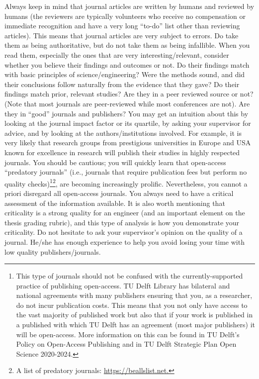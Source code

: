 \documentclass{article}
\begin{document}
Always keep in mind that journal articles are written by humans and reviewed by humans (the reviewers are typically volunteers who receive no compensation or immediate recognition and have a very long “to-do” list other than reviewing articles). This means that journal articles are very subject to errors. Do take them as being authoritative, but do not take them as being infallible. When you read them, especially the ones that are very interesting/relevant, consider whether you believe their findings and outcomes or not. Do their findings match with basic principles of science/engineering? Were the methods sound, and did their conclusions follow naturally from the evidence that they gave? Do their findings match prior, relevant studies? Are they in a peer reviewed source or not? (Note that most journals are peer-reviewed while most conferences are not). Are they in “good” journals and publishers? You may get an intuition about this by looking at the journal impact factor or its quartile, by asking your supervisor for advice, and by looking at the authors/institutions involved. For example, it is very likely that research groups from prestigious universities in Europe and USA known for excellence in research will publish their studies in highly respected journals. You should be cautious; you will quickly learn that open-access “predatory journals”\cite{predatory} (i.e., journals that require publication fees but perform no quality checks)\footnote{This type of journals should not be confused with the currently-supported practice of publishing open-access. TU Delft Library has bilateral and national agreements with many publishers ensuring that you, as a researcher, do not incur publication costs. This means that you not only have access to the vast majority of published work but also that if your work is published in a published with which TU Delft has an agreement (most major publishers) it will be open-access. More information on this can be found in TU Delft’s Policy on Open-Access Publishing and in TU Delft Strategic Plan Open Science 2020-2024.}\footnote{A list of predatory journals: \url{https://beallslist.net.}}, are becoming increasingly prolific. Nevertheless, you cannot a priori disregard all open-access journals. You always need to have a critical assessment of the information available. It is also worth mentioning that criticality is a strong quality for an engineer (and an important element on the thesis grading rubric), and this type of analysis is how you demonstrate your criticality. Do not hesitate to ask your supervisor’s opinion on the quality of a journal. He/she has enough experience to help you avoid losing your time with low quality publishers/journals. 
\end{document}
